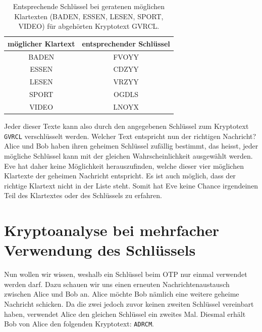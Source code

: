 \begin{table}[H]
	\centering
	\begin{tabular}{c|c}
		möglicher Klartext & entsprechender Schlüssel \\ \midrule\midrule
		BADEN              & FVOYY                    \\\midrule
		ESSEN              & CDZYY                    \\\midrule
		LESEN              & VRZYY                    \\\midrule
		SPORT              & OGDLS                    \\\midrule
		VIDEO              & LNOYX
	\end{tabular}
	\caption{Entsprechende Schlüssel bei geratenen möglichen Klartexten (BADEN, ESSEN, LESEN, SPORT, VIDEO) für abgehörten Kryptotext GVRCL.}
	\label{tab:GVRCL}
\end{table}
Jeder dieser Texte kann also durch den angegebenen Schlüssel zum Kryptotext \verb|GVRCL|
verschlüsselt werden. Welcher Text entspricht nun der richtigen Nachricht? Alice und Bob
haben ihren geheimen Schlüssel zufällig bestimmt, das heisst, jeder mögliche Schlüssel
kann mit der gleichen Wahrscheinlichkeit ausgewählt werden. Eve hat daher keine Möglichkeit herauszufinden, welche dieser vier möglichen Klartexte der geheimen Nachricht
entspricht. Es ist auch möglich, dass der richtige Klartext nicht in der Liste steht. Somit
hat Eve keine Chance irgendeinen Teil des Klartextes oder des Schlüssels zu erfahren.

\section{Kryptoanalyse bei mehrfacher Verwendung des Schlüssels}
Nun wollen wir wissen, weshalb ein Schlüssel beim \gls{OTP} nur einmal verwendet werden darf. Dazu schauen wir uns einen erneuten Nachrichtenaustausch zwischen
Alice und Bob an.
Alice möchte Bob nämlich eine weitere geheime Nachricht schicken. Da die zwei
jedoch zuvor keinen zweiten Schlüssel vereinbart haben, verwendet Alice den gleichen
Schlüssel ein zweites Mal. Diesmal erhält Bob von Alice den folgenden Kryptotext: \verb|ADRCM|.

